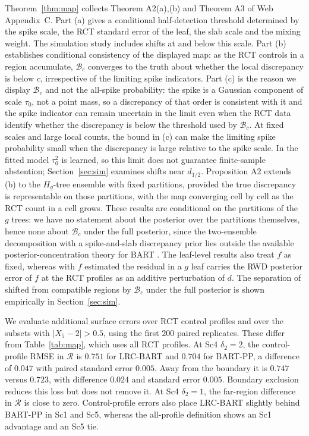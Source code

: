 Theorem~\ref{thm:map} collects Theorem A2(a),(b) and Theorem A3 of Web Appendix~C. Part (a) gives a conditional half-detection threshold determined by the spike scale, the RCT standard error of the leaf, the slab scale and the mixing weight. The simulation study includes shifts at and below this scale. Part (b) establishes conditional consistency of the displayed map: as the RCT controls in a region accumulate, $\mathcal B_c$ converges to the truth about whether the local discrepancy is below $c$, irrespective of the limiting spike indicators. Part (c) is the reason we display $\mathcal B_c$ and not the all-spike probability: the spike is a Gaussian component of scale $\tau_0$, not a point mass, so a discrepancy of that order is consistent with it and the spike indicator can remain uncertain in the limit even when the RCT data identify whether the discrepancy is below the threshold used by $\mathcal B_c$. At fixed scales and large local counts, the bound in (c) can make the limiting spike probability small when the discrepancy is large relative to the spike scale. In the fitted model $\tau_0^2$ is learned, so this limit does not guarantee finite-sample abstention; Section~\ref{sec:sim} examines shifts near $d_{1/2}$. Proposition A2 extends (b) to the $H_g$-tree ensemble with fixed partitions, provided the true discrepancy is representable on those partitions, with the map converging cell by cell as the RCT count in a cell grows. These results are conditional on the partitions of the $g$ trees: we have no statement about the posterior over the partitions themselves, hence none about $\mathcal B_c$ under the full posterior, since the two-ensemble decomposition with a spike-and-slab discrepancy prior lies outside the available posterior-concentration theory for BART \citep{rockova2020bart}. The leaf-level results also treat $f$ as fixed, whereas with $f$ estimated the residual in a $g$ leaf carries the RWD posterior error of $f$ at the RCT profiles as an additive perturbation of $d$. The separation of shifted from compatible regions by $\mathcal B_c$ under the full posterior is shown empirically in Section~\ref{sec:sim}.


We evaluate additional surface errors over RCT control profiles and over the subsets with $|X_5-2|>0.5$, using the first $200$ paired replicates. These differ from Table~\ref{tab:map}, which uses all RCT profiles. At Sc4 $\delta_2=2$, the control-profile RMSE in $\mathcal R$ is $0.751$ for LRC-BART and $0.704$ for BART-PP, a difference of $0.047$ with paired standard error $0.005$. Away from the boundary it is $0.747$ versus $0.723$, with difference $0.024$ and standard error $0.005$. Boundary exclusion reduces this loss but does not remove it. At Sc4 $\delta_2=1$, the far-region difference in $\mathcal R$ is close to zero. Control-profile errors also place LRC-BART slightly behind BART-PP in Sc1 and Sc5, whereas the all-profile definition shows an Sc1 advantage and an Sc5 tie.

